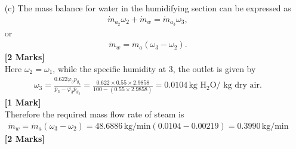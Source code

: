 \documentclass[12pt,twoside]{report}
\renewcommand\phi{\varphi}
\begin{document}
\begin{description}
\begin{itemize}
\item[(c)] The mass balance for water in the humidifying section can be expressed as
\begin{align*}
 \dot{m}_{a_2} \omega_2 + \dot{m}_w = \dot{m}_{a_3} \omega_3,
\end{align*}
or
\begin{align*}
 \dot{m}_w = \dot{m}_a \left(\omega_3 - \omega_2\right).
\end{align*} \hfill \textbf{[2 Marks]} \\
Here $\omega_2 = \omega_1$, while the specific humidity at 3, the outlet is given by
\begin{align*}
 \omega_3 = \frac{0.622 \phi_3 p_{g_3}}{p_3 - \phi_3 p_{g_3}} = \frac{0.622 \times 0.55 \times 2.9858}{100 - \left(0.55 \times 2.9858\right)} = 0.0104\,\mbox{kg H$_2$O/ kg dry air}.
\end{align*} \hfill \textbf{[1 Mark]} \\
Therefore the required mass flow rate of steam is
\begin{align*}
 \dot{m}_w = \dot{m}_a \left(\omega_3 - \omega_2\right) = 48.6886\,\mbox{kg/min}\left(0.0104 - 0.00219\right) = 0.3990\,\mbox{kg/min}
\end{align*} \hfill \textbf{[2 Marks]}

\end{itemize}




\end{description}

%
%
%
%
\end{document}
